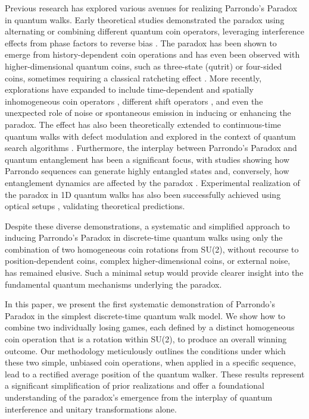 \documentclass[11pt,letterpaper,twocolumn]{article} %
\begin{document}
Previous research has explored various avenues for realizing Parrondo's Paradox
in quantum walks. Early theoretical studies demonstrated the paradox using
alternating or combining different quantum coin operators, leveraging
interference effects from phase factors to reverse bias \cite{chandrashekar2011,flitney2012, li2013}. The paradox has been shown to emerge from
history-dependent coin operations \cite{flitney2004} and has even been
observed with higher-dimensional quantum coins, such as three-state
(qutrit) or four-sided coins, sometimes requiring a classical ratcheting effect
\cite{rajendran2018playing, lai2020parrondo, walczak2022parrondo}. More recently,
explorations have expanded to include time-dependent and spatially
inhomogeneous coin operators \cite{pires2020parrondo, mittal2024parrondo,
walczak2025parrondo}, different shift operators \cite{walczak2024parrondo},
and even the unexpected role of noise \cite{walczak2023noise} or
spontaneous emission \cite{bolik2024spontaneous} in inducing or enhancing
the paradox. The effect has also been theoretically extended to
continuous-time quantum walks with defect modulation \cite{ximenes2024parrondo}
and explored in the context of quantum search algorithms
\cite{hosaka2024parrondo}. Furthermore, the interplay between Parrondo's Paradox
and quantum entanglement has been a significant focus, with studies
showing how Parrondo sequences can generate highly entangled states
\cite{panda2022generating, jan2023territories} and, conversely, how entanglement
dynamics are affected by the paradox \cite{walczak2021parrondo,
walczak2023noise, walczak2025parrondo}. Experimental realization of the paradox
in 1D quantum walks has also been successfully achieved using optical setups
\cite{jan2020experimental}, validating theoretical predictions.

Despite these diverse demonstrations, a systematic and simplified approach to
inducing Parrondo's Paradox in discrete-time quantum walks using only the
combination of two homogeneous coin rotations from SU(2), without
recourse to position-dependent coins, complex higher-dimensional coins, or
external noise, has remained elusive. Such a minimal setup would provide clearer
insight into the fundamental quantum mechanisms underlying the paradox.

In this paper, we present the first systematic demonstration of Parrondo's
Paradox in the simplest discrete-time quantum walk model. We show how to
combine two individually losing games, each defined by a distinct homogeneous
coin operation that is a rotation within SU(2), to produce an overall winning
outcome. Our methodology meticulously outlines the conditions under which these
two simple, unbiased coin operations, when applied in a specific sequence, lead
to a rectified average position of the quantum walker. These results represent a
significant simplification of prior realizations and offer a foundational
understanding of the paradox's emergence from the interplay of quantum
interference and unitary transformations alone.
\end{document}
